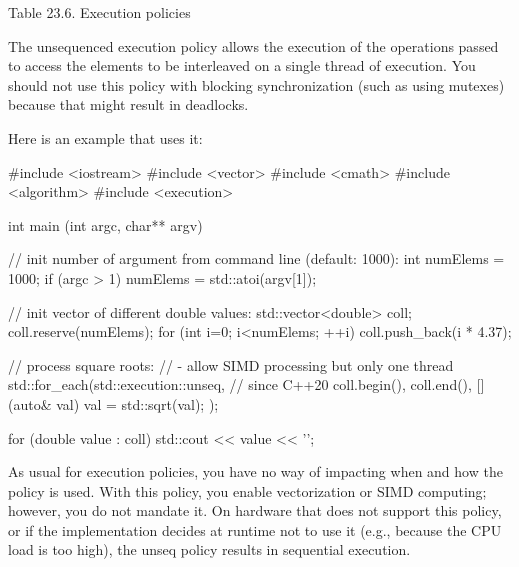 \begin{center}
Table 23.6. Execution policies
\end{center}

The unsequenced execution policy allows the execution of the operations passed to access the elements to be interleaved on a single thread of execution. You should not use this policy with blocking synchronization (such as using mutexes) because that might result in deadlocks.

Here is an example that uses it:


\begin{cpp}
#include <iostream>
#include <vector>
#include <cmath>
#include <algorithm>
#include <execution>

int main (int argc, char** argv)
{
	// init number of argument from command line (default: 1000):
	int numElems = 1000;
	if (argc > 1) {
		numElems = std::atoi(argv[1]);
	}
	
	// init vector of different double values:
	std::vector<double> coll;
	coll.reserve(numElems);
	for (int i=0; i<numElems; ++i) {
		coll.push_back(i * 4.37);
	}
	
	// process square roots:
	// - allow SIMD processing but only one thread
	std::for_each(std::execution::unseq, // since C++20
				  coll.begin(), coll.end(),
				  [](auto& val) {
					val = std::sqrt(val);
				  });
				  
	for (double value : coll) {
		std::cout << value << '\n';
	}
}
\end{cpp}

As usual for execution policies, you have no way of impacting when and how the policy is used. With this policy, you enable vectorization or SIMD computing; however, you do not mandate it. On hardware that does not support this policy, or if the implementation decides at runtime not to use it (e.g., because the CPU load is too high), the unseq policy results in sequential execution.




















